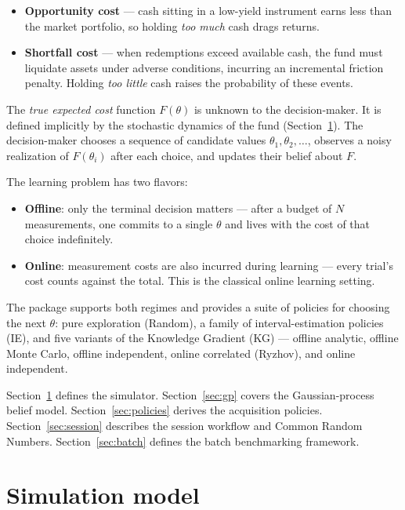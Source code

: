 \documentclass[11pt]{article}
\newcommand{\Cstar}{\theta}
\begin{document}
\begin{itemize}[nosep]
  \item \textbf{Opportunity cost} — cash sitting in a low-yield instrument
    earns less than the market portfolio, so holding \emph{too much} cash
    drags returns.
  \item \textbf{Shortfall cost} — when redemptions exceed available cash,
    the fund must liquidate assets under adverse conditions, incurring
    an incremental friction penalty. Holding \emph{too little} cash raises
    the probability of these events.
\end{itemize}

The \emph{true expected cost} function $F(\Cstar)$ is unknown to the
decision-maker. It is defined implicitly by the stochastic dynamics of the
fund (Section~\ref{sec:sim}). The decision-maker chooses a sequence of
candidate values $\theta_1, \theta_2, \dots$, observes a noisy realization of
$F(\theta_i)$ after each choice, and updates their belief about $F$.

The learning problem has two flavors:
\begin{itemize}[nosep]
  \item \textbf{Offline}: only the terminal decision matters — after a
    budget of $N$ measurements, one commits to a single $\Cstar$ and lives
    with the cost of that choice indefinitely.
  \item \textbf{Online}: measurement costs are also incurred during
    learning — every trial's cost counts against the total. This is the
    classical online learning setting.
\end{itemize}

The package supports both regimes and provides a suite of policies for
choosing the next $\theta$: pure exploration (Random), a family of
interval-estimation policies (IE), and five variants of the Knowledge
Gradient (KG) — offline analytic, offline Monte Carlo, offline independent,
online correlated (Ryzhov), and online independent.

Section~\ref{sec:sim} defines the simulator. Section~\ref{sec:gp} covers the
Gaussian-process belief model. Section~\ref{sec:policies} derives the
acquisition policies. Section~\ref{sec:session} describes the session
workflow and Common Random Numbers. Section~\ref{sec:batch} defines the
batch benchmarking framework.

\section{Simulation model}
\label{sec:sim}
\end{document}
